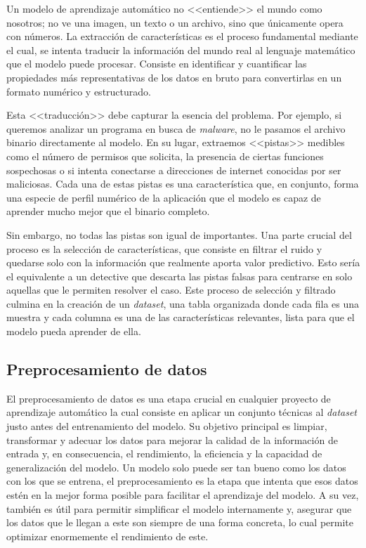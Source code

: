 Un modelo de aprendizaje automático no <<entiende>> el mundo como nosotros; no ve una imagen, un texto o un archivo, sino que únicamente opera con números. La extracción de características es el proceso fundamental mediante el cual, se intenta traducir la información del mundo real al lenguaje matemático que el modelo puede procesar. Consiste en identificar y cuantificar las propiedades más representativas de los datos en bruto para convertirlas en un formato numérico y estructurado.

Esta <<traducción>> debe capturar la esencia del problema. Por ejemplo, si queremos analizar un programa en busca de \textit{malware}, no le pasamos el archivo binario directamente al modelo. En su lugar, extraemos <<pistas>> medibles como el número de permisos que solicita, la presencia de ciertas funciones sospechosas o si intenta conectarse a direcciones de internet conocidas por ser maliciosas. Cada una de estas pistas es una característica que, en conjunto, forma una especie de perfil numérico de la aplicación que el modelo es capaz de aprender mucho mejor que el binario completo.

Sin embargo, no todas las pistas son igual de importantes. Una parte crucial del proceso es la selección de características, que consiste en filtrar el ruido y quedarse solo con la información que realmente aporta valor predictivo. Esto sería el equivalente a un detective que descarta las pistas falsas para centrarse en solo aquellas que le permiten resolver el caso. Este proceso de selección y filtrado culmina en la creación de un \textit{dataset}, una tabla organizada donde cada fila es una muestra y cada columna es una de las características relevantes, lista para que el modelo pueda aprender de ella.

\subsection{Preprocesamiento de datos}

El preprocesamiento de datos es una etapa crucial en cualquier proyecto de aprendizaje automático la cual consiste en aplicar un conjunto técnicas al \textit{dataset} justo antes del entrenamiento del modelo. Su objetivo principal es limpiar, transformar y adecuar los datos para mejorar la calidad de la información de entrada y, en consecuencia, el rendimiento, la eficiencia y la capacidad de generalización del modelo. Un modelo solo puede ser tan bueno como los datos con los que se entrena, el preprocesamiento es la etapa que intenta que esos datos estén en la mejor forma posible para facilitar el aprendizaje del modelo. A su vez, también es útil para permitir simplificar el modelo internamente y, asegurar que los datos que le llegan a este son siempre de una forma concreta, lo cual permite optimizar enormemente el rendimiento de este.

